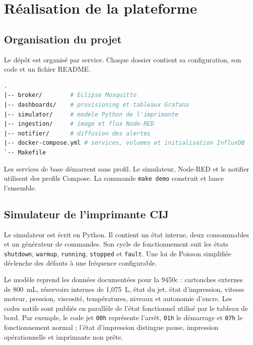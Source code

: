\chapter{Réalisation de la plateforme}

\section{Organisation du projet}

Le dépôt est organisé par service. Chaque dossier contient sa configuration,
son code et un fichier README.

\begin{lstlisting}[language=bash,caption={Organisation des principaux composants}]
.
|-- broker/        # Eclipse Mosquitto
|-- dashboards/    # provisioning et tableaux Grafana
|-- simulator/     # modele Python de l'imprimante
|-- ingestion/     # image et flux Node-RED
|-- notifier/      # diffusion des alertes
|-- docker-compose.yml # services, volumes et initialisation InfluxDB
`-- Makefile
\end{lstlisting}

Les services de base démarrent sans profil. Le simulateur, Node-RED et le
notifier utilisent des profils Compose. La commande \texttt{make demo}
construit et lance l'ensemble.

\section{Simulateur de l'imprimante CIJ}

Le simulateur est écrit en Python. Il contient un état interne, deux
consommables et un générateur de commandes. Son cycle de fonctionnement suit
les états \texttt{shutdown}, \texttt{warmup}, \texttt{running},
\texttt{stopped} et \texttt{fault}. Une loi de Poisson simplifiée déclenche des
défauts à une fréquence configurable.

Le modèle reprend les données documentées pour la 9450c : cartouches externes
de 800~mL, réservoirs internes de 1,075~L, état du jet, état d'impression,
vitesse moteur, pression, viscosité, températures, niveaux et autonomie
d'encre. Les codes natifs sont publiés en parallèle de l'état
fonctionnel utilisé par le tableau de bord. Par exemple, le code jet
\texttt{00h} représente l'arrêt, \texttt{01h} le démarrage et \texttt{07h} le
fonctionnement normal ; l'état d'impression distingue pause, impression
opérationnelle et imprimante non prête.

